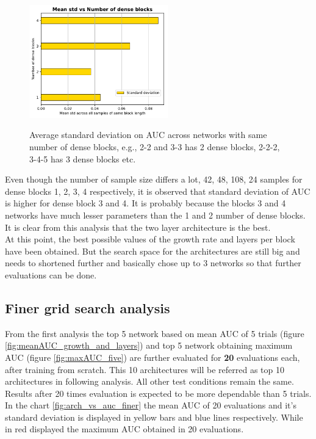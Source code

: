 \begin{figure}[ht]
\centering
\includegraphics[width=6cm]{images/densenet/siamese/densenet_siamese_std_blocks_bar}
\label{std_dense_blocks}
\caption{Average standard deviation on AUC across networks with same number of dense blocks, e.g., 2-2 and 3-3 has 2 dense blocks, 2-2-2, 3-4-5 has 3 dense blocks etc.}
\end{figure}

Even though the number of sample size differs a lot, 42, 48, 108, 24 samples for dense blocks 1, 2, 3, 4 respectively, it is observed that standard deviation of AUC is higher for dense block 3 and 4.
It is probably because the blocks 3 and 4 networks have much lesser parameters than the 1 and 2 number of dense blocks. It is clear from this analysis that the two layer architecture is the best.\\

At this point, the best possible values of the growth rate and layers per block have been obtained. But the search space for the architectures are still big and needs to shortened further and basically chose up to 3 networks so that further 
evaluations can be done. 

\subsection{Finer grid search analysis}
From the first analysis the top 5 network based on mean AUC of 5 trials (figure \ref{fig:meanAUC_growth_and_layers}) and top 5 network obtaining maximum AUC (figure \ref{fig:maxAUC_five}) are further evaluated for \textbf{20} 
evaluations each, after training from scratch. This 10 architectures will be referred as top 10 architectures in following analysis. All other test conditions remain the same. Results after 20 times evaluation is expected to 
be more dependable than 5 trials. In the chart \ref{fig:arch_vs_auc_finer} the mean AUC of 20 evaluations and it's standard deviation is displayed in yellow bars and blue lines respectively. 
While in red displayed the maximum AUC obtained in 20 evaluations.

